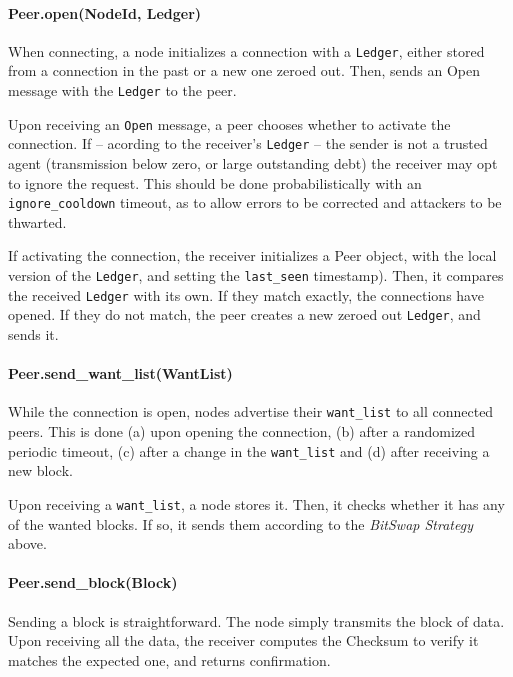 \documentclass{sig-alternate}
\begin{document}
\paragraph{Peer.open(NodeId, Ledger)}

When connecting, a node initializes a connection with a
\texttt{Ledger}, either stored from a connection in the past or a new one
zeroed out. Then, sends an Open message with the \texttt{Ledger} to the peer.

Upon receiving an \texttt{Open} message, a peer chooses whether to activate
the connection. If -- acording to the receiver's \texttt{Ledger} -- the sender
is not a trusted agent (transmission below zero, or large outstanding debt) the
receiver may opt to ignore the request. This should be done probabilistically
with an \texttt{ignore\_cooldown} timeout, as to allow errors to be corrected
and attackers to be thwarted.

If activating the connection, the receiver initializes a Peer object, with the
local version of the \texttt{Ledger}, and setting the \texttt{last\_seen}
timestamp). Then, it compares the received
\texttt{Ledger} with its own. If they match exactly, the connections have
opened. If they do not match, the peer creates a new zeroed out
\texttt{Ledger}, and sends it.


\paragraph{Peer.send\_want\_list(WantList)}

While the connection is open, nodes advertise their
\texttt{want\_list} to all connected peers. This is done (a) upon opening the
connection, (b) after a randomized periodic timeout, (c) after a change in
the \texttt{want\_list} and (d) after receiving a new block.

Upon receiving a \texttt{want\_list}, a node stores it. Then, it checks whether
it has any of the wanted blocks. If so, it sends them according to the
\textit{BitSwap Strategy} above.

\paragraph{Peer.send\_block(Block)}

Sending a block is straightforward. The node simply transmits the block of
data. Upon receiving all the data, the receiver computes the Checksum to
verify it matches the expected one, and returns confirmation.
\end{document}
